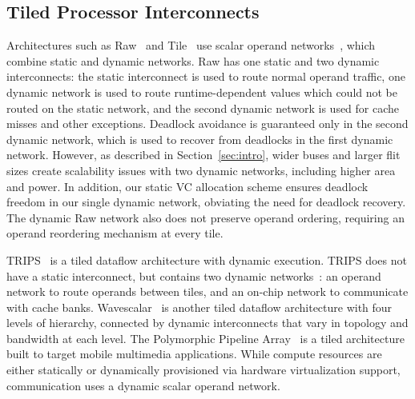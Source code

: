 \subsection{Tiled Processor Interconnects} Architectures such as Raw~\cite{raw} and Tile~\cite{tile} use scalar operand networks~\cite{son}, which combine static and dynamic networks. Raw has one static and two dynamic interconnects: the static interconnect is used to route normal operand traffic, one dynamic network is used to route runtime-dependent values which could not be routed on the static network, and the second dynamic network is used for cache misses and other exceptions. Deadlock avoidance is guaranteed only in the second dynamic network, which is used to recover from deadlocks in the first dynamic network. However, as described in Section~\ref{sec:intro}, wider buses and larger flit sizes create scalability issues with two dynamic networks, including higher area and power. In addition, our static VC allocation scheme ensures deadlock freedom in our single dynamic network, obviating the need for deadlock recovery.
The dynamic Raw network also does not preserve operand ordering, requiring an operand reordering mechanism at every tile.

TRIPS~\cite{trips} is a tiled dataflow architecture with dynamic execution. TRIPS does not have a static interconnect, but contains two dynamic networks~\cite{trips-network}: an operand network  to route operands between tiles, and an on-chip network  to communicate with cache banks. Wavescalar~\cite{wavescalar} is another tiled dataflow architecture with four levels of hierarchy, connected by dynamic interconnects that vary in topology and bandwidth at each level. The Polymorphic Pipeline Array~\cite{ppa} is a tiled architecture built to target mobile multimedia applications. While compute resources are either statically or dynamically provisioned via hardware virtualization support, communication uses a dynamic scalar operand network.

